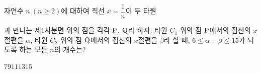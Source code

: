 자연수 $n\ (n\ge 2)$에 대하여 직선 $x=\dfrac{1}{n}$이 두 타원 \par\smallskip{}\par\smallskip\noindent 과 만나는 제$1$사분면 위의 점을 각각 $\mathrm{P}$, $\mathrm{Q}$라 하자. 타원 $C_1$ 위의 점 $\mathrm{P}$에서의 접선의 $x$절편을 $\alpha$, 타원 $C_2$ 위의 점 $\mathrm{Q}$에서의 접선의 $x$절편을 $\beta$라 할 때, $6\le\alpha-\beta\le 15$가 되도록 하는 모든 $n$의 개수는?
\begin{choices32}{$7$}{$9$}{$11$}{$13$}{$15$}\end{choices32}
